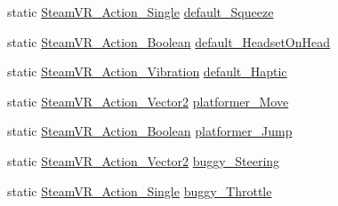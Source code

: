 \begin{DoxyCompactItemize}
\item 
static \mbox{\hyperlink{class_valve_1_1_v_r_1_1_steam_v_r___action___single}{Steam\+V\+R\+\_\+\+Action\+\_\+\+Single}} \mbox{\hyperlink{class_valve_1_1_v_r_1_1_steam_v_r___actions_a1fa58841fd9ce6dd449502fa74b382f2}{default\+\_\+\+Squeeze}}
\item 
static \mbox{\hyperlink{class_valve_1_1_v_r_1_1_steam_v_r___action___boolean}{Steam\+V\+R\+\_\+\+Action\+\_\+\+Boolean}} \mbox{\hyperlink{class_valve_1_1_v_r_1_1_steam_v_r___actions_a747ee3d18fb046e03b34208bb6873ff1}{default\+\_\+\+Headset\+On\+Head}}
\item 
static \mbox{\hyperlink{class_valve_1_1_v_r_1_1_steam_v_r___action___vibration}{Steam\+V\+R\+\_\+\+Action\+\_\+\+Vibration}} \mbox{\hyperlink{class_valve_1_1_v_r_1_1_steam_v_r___actions_a1dc6736d18271a6ca2ccf39875f37706}{default\+\_\+\+Haptic}}
\item 
static \mbox{\hyperlink{class_valve_1_1_v_r_1_1_steam_v_r___action___vector2}{Steam\+V\+R\+\_\+\+Action\+\_\+\+Vector2}} \mbox{\hyperlink{class_valve_1_1_v_r_1_1_steam_v_r___actions_a2257c24b61ed3abcc4c8f777eb24f718}{platformer\+\_\+\+Move}}
\item 
static \mbox{\hyperlink{class_valve_1_1_v_r_1_1_steam_v_r___action___boolean}{Steam\+V\+R\+\_\+\+Action\+\_\+\+Boolean}} \mbox{\hyperlink{class_valve_1_1_v_r_1_1_steam_v_r___actions_a878bba23e9730e5e2601bc3052e3bb4f}{platformer\+\_\+\+Jump}}
\item 
static \mbox{\hyperlink{class_valve_1_1_v_r_1_1_steam_v_r___action___vector2}{Steam\+V\+R\+\_\+\+Action\+\_\+\+Vector2}} \mbox{\hyperlink{class_valve_1_1_v_r_1_1_steam_v_r___actions_ac4481ccbf0fe3042be55fe1daa8107c0}{buggy\+\_\+\+Steering}}
\item 
static \mbox{\hyperlink{class_valve_1_1_v_r_1_1_steam_v_r___action___single}{Steam\+V\+R\+\_\+\+Action\+\_\+\+Single}} \mbox{\hyperlink{class_valve_1_1_v_r_1_1_steam_v_r___actions_aa3c4a28303e0e31d45be2928de60cb1a}{buggy\+\_\+\+Throttle}}

\end{DoxyCompactItemize}
